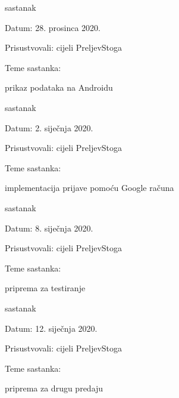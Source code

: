 \begin{packed_enum}
			\item  sastanak
			\item[] \begin{packed_item}
				\item Datum: 28. prosinca 2020.
				\item Prisustvovali: cijeli PreljevStoga
				\item Teme sastanka:
				\begin{packed_item}
					\item  prikaz podataka na Androidu
				\end{packed_item}
			\end{packed_item}
			
			\item  sastanak
			\item[] \begin{packed_item}
				\item Datum: 2. siječnja 2020.
				\item Prisustvovali: cijeli PreljevStoga
				\item Teme sastanka:
				\begin{packed_item}
					\item  implementacija prijave pomoću Google računa
				\end{packed_item}
			\end{packed_item}
			
			\item  sastanak
			\item[] \begin{packed_item}
				\item Datum: 8. siječnja 2020.
				\item Prisustvovali: cijeli PreljevStoga
				\item Teme sastanka:
				\begin{packed_item}
					\item  priprema za testiranje
				\end{packed_item}
			\end{packed_item}
			
			\item  sastanak
			\item[] \begin{packed_item}
				\item Datum: 12. siječnja 2020.
				\item Prisustvovali: cijeli PreljevStoga
				\item Teme sastanka:
				\begin{packed_item}
					\item  priprema za drugu predaju
				\end{packed_item}
			\end{packed_item}
			
			
		\end{packed_enum}
		
